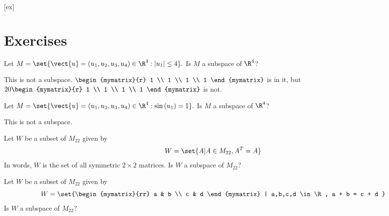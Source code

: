 [ex]
\section*{Exercises}

\begin{enumialphparenastyle}

\begin{ex} Let $M=\set{\vect{u}=\left( u_{1},u_{2},u_{3},u_{4}\right) \in 
\R^{4}:\left| u_{1}\right| \leq 4} .$ Is $M$ a subspace of $\R^4$?
\begin{sol}
This is not a subspace. $\begin{mymatrix}{r}
1 \\
1 \\
1 \\
1
\end{mymatrix} $ is in
it, but $20\begin{mymatrix}{r}
1 \\
1 \\
1 \\
1
\end{mymatrix} $ is not. 
\end{sol}
\end{ex}

\begin{ex} Let $M=\set{\vect{u}=\left( u_{1},u_{2},u_{3},u_{4}\right) \in 
\R^{4}:\sin \left( u_{1}\right) =1} .$ Is $M$ a subspace of $\R^4$?
\begin{sol}
This is not a subspace.
\end{sol}
\end{ex}

\begin{ex} Let $W$ be a subset of $M_{22}$ given by 
\[
W = \set{A | A \in M_{22}, A^T = A }  
\]
In words, $W$ is the set of all symmetric $2 \times 2$ matrices. Is $W$ a subspace of $M_{22}$?
\end{ex}

\begin{ex} Let $W$ be a subset of $M_{22}$ given by 
\[
W = \set{\begin{mymatrix}{rr}
a  & b \\
c & d 
\end{mymatrix} | a,b,c,d \in \R, a + b = c + d }
\]
Is $W$ a subspace of $M_{22}$?
\end{ex}


\end{enumialphparenastyle}
